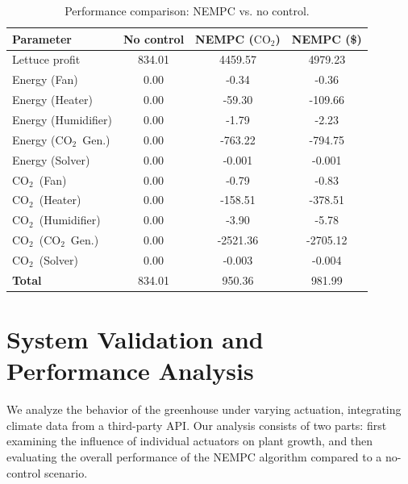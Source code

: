 \documentclass[conference]{IEEEtran}
\newcommand{\coo}{\ensuremath{\mathrm{CO_2}}}
\begin{document}
\begin{table}
    \centering
    \caption{Performance comparison: NEMPC {vs. } no control.}\label{tab:comparison}
    \setlength{\tabcolsep}{4pt} %
    \begin{tabular}{lS[table-format=3.2]S[table-format=4.2]S[table-format=4.2]}
        \toprule
        \textbf{Parameter}  & {No control} & {NEMPC (\coo)} & {NEMPC (\$)} \\
        \midrule
        Lettuce profit      & 834.01       & 4459.57        & 4979.23      \\
        Energy (Fan)        & 0.00         & -0.34          & -0.36        \\
        Energy (Heater)     & 0.00         & -59.30         & -109.66      \\
        Energy (Humidifier) & 0.00         & -1.79          & -2.23        \\
        Energy (\coo\ Gen.) & 0.00         & -763.22        & -794.75      \\
        Energy (Solver)     & 0.00         & -0.001         & -0.001       \\
        \coo\ (Fan)         & 0.00         & -0.79          & -0.83        \\
        \coo\ (Heater)      & 0.00         & -158.51        & -378.51      \\
        \coo\ (Humidifier)  & 0.00         & -3.90          & -5.78        \\
        \coo\ (\coo\ Gen.)  & 0.00         & -2521.36       & -2705.12     \\
        \coo\ (Solver)      & 0.00         & -0.003         & -0.004       \\
        \midrule
        \textbf{Total}      & 834.01       & 950.36         & 981.99       \\
        \bottomrule
    \end{tabular}
\end{table}

\section{System Validation and Performance Analysis}
We analyze the behavior of the greenhouse under varying actuation, integrating climate data from a third-party API\@. Our analysis consists of two parts: first examining the influence of individual actuators on plant growth, and then evaluating the overall performance of the NEMPC algorithm compared to a no-control scenario.
\end{document}
